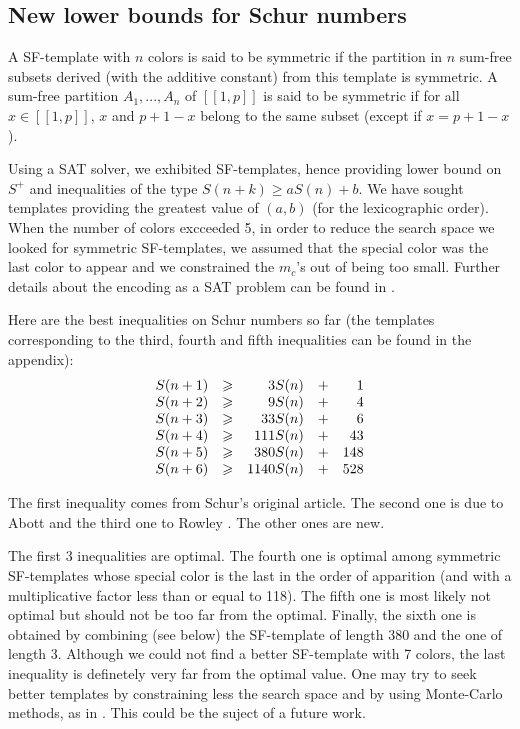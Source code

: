\subsection{New lower bounds for Schur numbers}

\begin{definition}
A SF-template with \(n\) colors is said to be symmetric if the partition in \(n\) sum-free subsets derived (with the additive constant) from this template is symmetric. 
A sum-free partition \(A_1, ..., A_n\) of \([\![1, p]\!]\) is said to be symmetric if for all \( x \in [\![1, p]\!]\), \(x\) and \(p + 1 - x\) belong to the same subset 
(except if \(x = p + 1 - x\)).
\end{definition}

Using a SAT solver, we exhibited SF-templates, hence providing lower bound on \(S^+\) and inequalities 
of the type \(S(n+k) \geqslant a S(n) + b\). We have sought templates providing the greatest value of 
\((a, b)\) (for the lexicographic order). When the number of colors excceeded 5, in order to reduce the search space we 
looked for symmetric SF-templates, we assumed that the special color was the last color to appear and we constrained 
the \(m_c\)'s out of being too small. Further details about the encoding as a SAT problem can be found in \cite{Heule2017}.

\par
Here are the best inequalities on Schur numbers so far (the templates corresponding to the third, fourth and fifth 
inequalities can be found in the appendix):
\[
\begin{array}{r r r r r}
	S(n + 1) & \geqslant & 3 S(n) & + & 1 \\
	S(n + 2) & \geqslant & 9 S(n) & + & 4 \\
	S(n + 3) & \geqslant & 33 S(n) & + & 6 \\
	S(n + 4) & \geqslant & 111 S(n) & + & 43 \\
	S(n + 5) & \geqslant & 380 S(n) & + & 148 \\
	S(n + 6) & \geqslant & 1140 S(n) & + & 528 \\
\end{array}
\]

The first inequality comes from  Schur's original article\cite{Schur1917}. The second one is due to
Abott \cite{AbbottHanson}
and the third one to Rowley \cite{RowleyRamsey}. The other ones are new.

\par
The first 3 inequalities are optimal. The fourth one is optimal among symmetric SF-templates whose special color is 
the last in the order of apparition (and with a multiplicative factor less than or equal to 118). The fifth one is most 
likely not optimal but should not be too far from the optimal. 
Finally, the sixth one is obtained by combining (see below) the SF-template of length 380 and the one of length 3. 
Although we could not find a better SF-template with 7 colors, the last inequality is definetely very far from the 
optimal value. One may try to seek better templates by constraining less the search space and by using 
Monte-Carlo methods, as in \cite{Bouzy2015AnAP}. This could be the suject of a future work.

